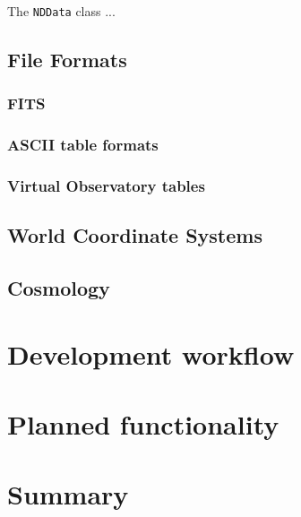 \documentclass[12pt,preprint]{aastex}
\begin{document}
The \texttt{NDData} class ...

\subsection{File Formats}


\subsubsection{FITS}



\subsubsection{ASCII table formats}



\subsubsection{Virtual Observatory tables}



\subsection{World Coordinate Systems}



\subsection{Cosmology}



\section{Development workflow}

\label{sec:workflow}




\section{Planned functionality}

\label{sec:future}



\section{Summary}

\label{sec:summary}




\end{document}
